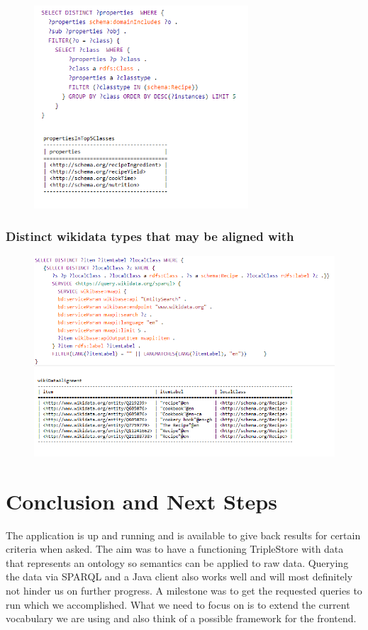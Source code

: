\documentclass{article}
\begin{document}
\begin{figure}[H]
  \centering
  \includegraphics[width=8cm]{pictures/res10_dist_prop_of_top5_classes.png}
  \label{fig:qures10}
\end{figure}

\subsubsection{Distinct wikidata types that may be aligned with}

\begin{figure}[H]
  \centering
  \includegraphics[width=12cm]{pictures/res11_align_wikidata.png}
  \label{fig:qures11}
\end{figure}
	
\section{Conclusion and Next Steps}
The application is up and running and is available to give back results for certain criteria when asked. The aim was to have a functioning TripleStore with data that represents an ontology so semantics can be applied to raw data. Querying the data via SPARQL and a Java client also works well and will most definitely not hinder us on further progress. A milestone was to get the requested queries to run which we accomplished. What we need to focus on is to extend the current vocabulary we are using and also think of a possible framework for the frontend.

	
\end{document}
